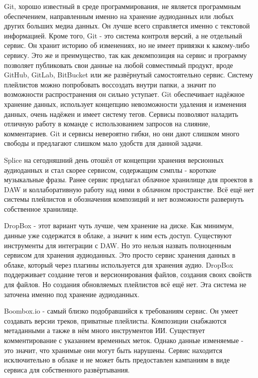 \documentclass[a4paper, 12pt, oneside]{article}
\begin{document}
Git, хорошо известный в среде программирования, не является программным обеспечением, направленным именно на хранение
аудиоданных или любых других больших медиа данных. Он лучше всего справляется именно с текстовой информацией. Кроме того, Git - это система контроля версий, 
а не отдельный сервис. Он хранит историю об изменениях, но не имеет привязки к какому-либо сервису. Это же и преимущество, так как
декомпозиция на сервис и программу позволяет публиковать свои данные на любой совместимый продукт, вроде GitHub, GitLab, BitBucket или же
развёрнутый самостоятельно сервис. Систему плейлистов можно попробовать воссоздать внутри папки, а значит по возможности распространения он сильно уступает. 
Git обеспечивает надёжное хранение данных, использует концепцию невозможности удаления и изменения данных, очень надёжен и имеет систему тегов.
Сервисы позволяют наладить отличную работу в команде с использованием запросов на слияние, комментариев. Git и сервисы невероятно гибки, 
но они дают слишком много свободы и предлагают слишком мало удобств для данной задачи.

Splice на сегодняшний день отошёл от концепции хранения версионных аудиоданных и стал скорее сервисом, содержащим сэмплы - короткие 
музыкальные фразы. Ранее сервис предлагал облачное хранилище для проектов в DAW и коллаборативную работу над ними в облачном пространстве. Всё 
ещё нет системы плейлистов и обозначения композиций и нет возможности развернуть собственное хранилище.

DropBox - этот вариант чуть лучше, чем хранение на диске. Как минимум, данные уже содержатся в облаке, а значит к ним есть доступ. 
Существуют инструменты для интеграции с DAW. Но это нельзя назвать полноценным сервисом для хранения аудиоданных. Это просто сервис 
хранения данных в облаке, который через плагины используется для хранения аудио. DropBox поддерживает создание тегов и версионирования 
файлов, создания своих свойств для файлов. Но создания обновляемых плейлистов всё ещё нет. Эта система не заточена именно под 
хранение аудиоданных.

Boombox.io - самый близко подобравшийся к требованиям сервис. Он умеет создавать версии треков, приватные плейлисты. Композиции
снабжаются метаданными а также в нём много инструментов ИИ. Существует комментирование с указанием временных меток.
Однако данные изменяемые - это значит, что хранимые они могут быть нарушены. 
Сервис находится исключительно в облаке и не может быть предоставлен кампаниям в виде сервиса для собственного развёртывания.
\end{document}
